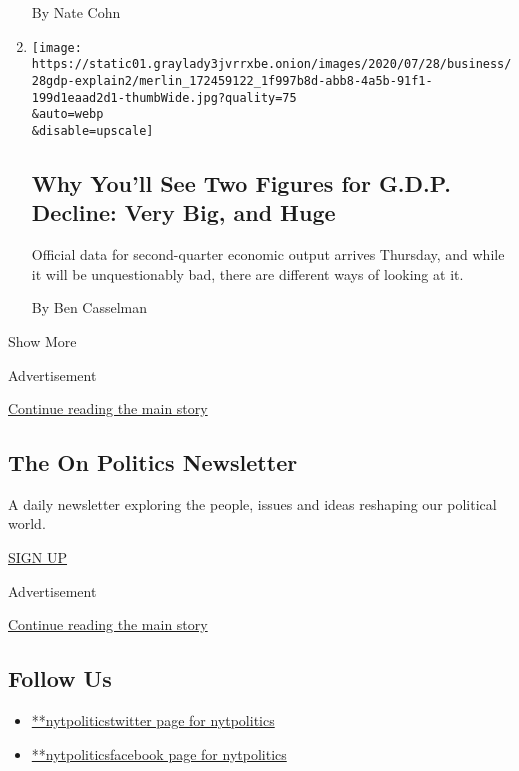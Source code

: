 \begin{enumerate}
  By Nate Cohn
\item
  \href{/2020/07/29/business/economy/us-gdp-report.html}{}

  \texttt{[image: https://static01.graylady3jvrrxbe.onion/images/2020/07/28/business/28gdp-explain2/merlin\_172459122\_1f997b8d-abb8-4a5b-91f1-199d1eaad2d1-thumbWide.jpg?quality=75\\\&auto=webp\\\&disable=upscale]}

  \hypertarget{why-youll-see-two-figures-for-gdp-decline-very-big-and-huge}{%
  \subsection{Why You'll See Two Figures for G.D.P. Decline: Very Big,
  and
  Huge}\label{why-youll-see-two-figures-for-gdp-decline-very-big-and-huge}}

  Official data for second-quarter economic output arrives Thursday, and
  while it will be unquestionably bad, there are different ways of
  looking at it.

  By Ben Casselman
\end{enumerate}

Show More

Advertisement

\protect\hyperlink{after-mid2}{Continue reading the main story}

\hypertarget{the-on-politics-newsletter}{%
\subsection{The On Politics
Newsletter}\label{the-on-politics-newsletter}}

A daily newsletter exploring the people, issues and ideas reshaping our
political world.

\href{/newsletters/signup/CN}{SIGN UP}

Advertisement

\protect\hyperlink{after-mktg}{Continue reading the main story}

\hypertarget{follow-us}{%
\subsection{Follow Us}\label{follow-us}}

\begin{itemize}
\tightlist
\item
  \href{https://twitter.com/nytpolitics}{**nytpoliticstwitter page for
  nytpolitics}
\item
  \href{https://www.facebookcorewwwi.onion/nytpolitics}{**nytpoliticsfacebook
  page for nytpolitics}
\end{itemize}


